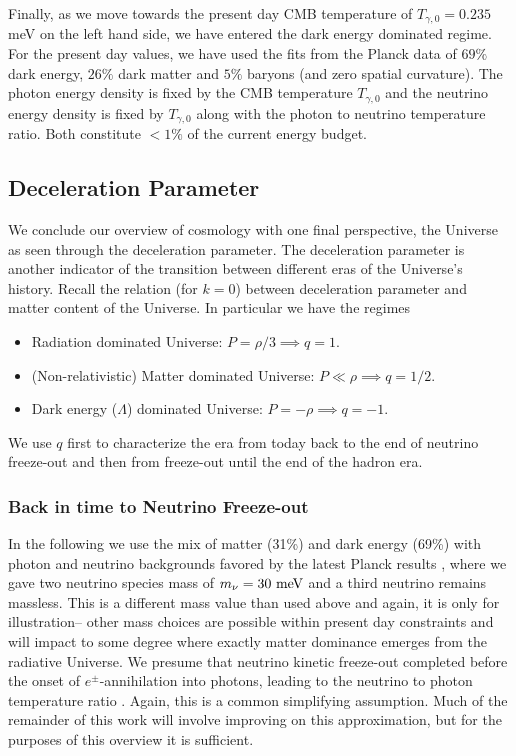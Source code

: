 Finally, as we move towards the present day CMB temperature of $T_{\gamma,0}=0.235$ meV on the left hand side, we have entered the dark energy dominated regime.  For the present day values, we have used the fits from the Planck data \cite{Planck} of  $69\%$ dark energy, $26\%$ dark matter and $5\%$ baryons (and zero spatial curvature).  The photon energy density is fixed by the CMB temperature $T_{\gamma,0}$ and the neutrino energy density is fixed by $T_{\gamma,0}$ along with the photon to neutrino temperature ratio.  Both constitute $<1\%$ of the current energy budget.

\subsection{Deceleration Parameter}
We conclude our overview of cosmology with one final perspective, the Universe as seen through the deceleration parameter.  The deceleration parameter is another indicator of the transition between different eras of the Universe's history.  Recall the relation  (for $k=0$)  between deceleration parameter and matter content of the Universe. In particular we have the regimes

\begin{itemize}
\item Radiation dominated Universe: $P=\rho/3 \implies q=1$.\\


\item  (Non-relativistic) Matter dominated Universe: $P\ll\rho \implies q=1/2$.\\



\item Dark energy ($\Lambda$) dominated Universe: $P=-\rho \implies q=-1$.\\

\end{itemize}
We use $q$ first to characterize the era from today back to the end of neutrino freeze-out and then from freeze-out until the end of the hadron era.


\subsubsection{Back in time to Neutrino Freeze-out}\label{recomb}
In the following we use the mix of matter  (31\%) and dark energy (69\%) with photon and neutrino backgrounds favored by the latest Planck results \cite{Planck}, where we gave two neutrino species mass of $m_\nu=30\text{ meV}$ and a third neutrino remains  massless.  This is a different mass value than used above and again, it is only for illustration-- other mass choices are possible within present day constraints and will impact to some degree where exactly matter dominance emerges from the radiative Universe.  We presume  that neutrino kinetic freeze-out completed before the onset of $e^\pm$-annihilation into  photons, leading to the neutrino to photon temperature ratio . Again, this is a common simplifying assumption.  Much of the remainder of this work will involve improving on this approximation, but for the purposes of this overview it is sufficient.

